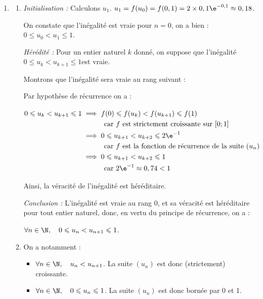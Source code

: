 \begin{enumerate}
		\item 
		\begin{enumerate}
			\item \emph{Initialisation :} Calculons $u_1$. $u_1 = f(u_0) = f(0,1) = 2\times 0,1\e^{-0,1} \approx 0,18$.

On constate que l'inégalité est vraie pour $n = 0$, on a bien : \quad $ 0\leqslant u_0 < u_1 \leqslant 1$.

\smallskip

\emph{Hérédité :} Pour un entier naturel $k$ donné, on suppose que l'inégalité \quad $ 0\leqslant u_k < u_{k+1} \leqslant 1$\quad est vraie.

Montrons que l'inégalité sera vraie au rang suivant :

Par hypothèse de récurrence on a :

$ \begin{aligned}[t] 0\leqslant u_k < u_{k+1} \leqslant 1
&\implies f(0) \leqslant f(u_k) < f(u_{k+1}) \leqslant f(1)\\
&\hphantom{\implies}\quad \text{car $f$ est strictement croissante sur }[0 ; 1]\\
&\implies 0 \leqslant u_{k+1 } < u_{k+2} \leqslant 2\e^{-1}\\
&\hphantom{\implies}\quad \text{car $f$ est la fonction de récurrence de la suite  } (u_n)\\
&\implies 0 \leqslant u_{k+1 } < u_{k+2} \leqslant 1\\
&\hphantom{\implies}\quad \text{car } 2\e^{-1} \approx 0,74 < 1\\		\end{aligned}$


Ainsi, la véracité de l'inégalité est héréditaire.

\smallskip

\emph{Conclusion :} L'inégalité est vraie au rang 0, et sa véracité est héréditaire pour tout entier naturel, donc, en vertu du principe de récurrence, on a :

$\forall n \in \N,\quad 0 \leqslant u_{n} < u_{n+1} \leqslant 1$.

		\item On a notamment :
\begin{itemize}
\item $\forall n \in \N,\quad u_{n} < u_{n+1}$. \quad La suite $(u_n)$ est donc (strictement) croissante.
\item $\forall n \in \N,\quad 0 \leqslant u_{n}\leqslant 1$. \quad La suite $(u_n)$ est donc bornée par 0 et 1.
\end{itemize}


\end{enumerate}
\end{enumerate}
